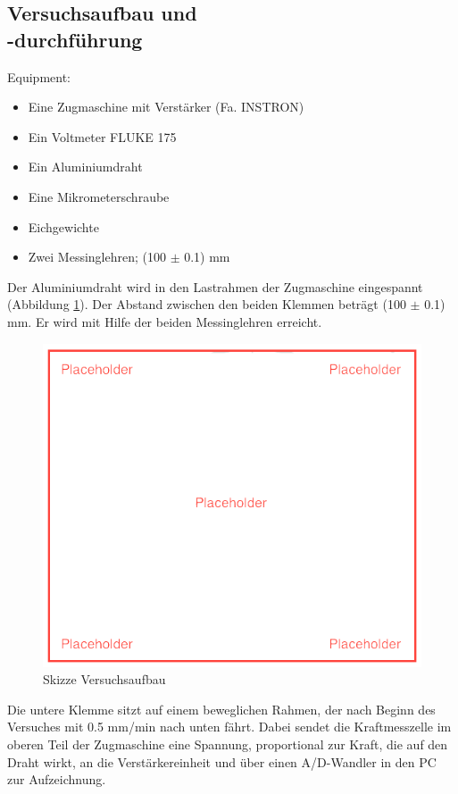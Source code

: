 \documentclass[12pt,a4paper]{article}
\begin{document}
\begin{multicols}{2}
\subsection{Versuchsaufbau und \\-durchführung}
Equipment:\\
\begin{itemize}
	\item Eine Zugmaschine mit Verstärker (Fa. INSTRON)
	\item Ein Voltmeter FLUKE 175
	\item Ein Aluminiumdraht
	\item Eine Mikrometerschraube
	\item Eichgewichte
	\item Zwei Messinglehren; (100 $\pm$ 0.1) mm
\end{itemize}
Der Aluminiumdraht wird in den Lastrahmen der Zugmaschine eingespannt (Abbildung \ref{fig:elastizitaet}). Der Abstand zwischen den beiden Klemmen beträgt (100 $\pm$ 0.1) mm. Er wird mit Hilfe der beiden Messinglehren erreicht.\\
\begin{figure}[H]
	\centering
	\includegraphics[scale=0.4]{./figure/placeholder.png}
	\caption{Skizze Versuchsaufbau}
	\label{fig:elastizitaet}
\end{figure}
Die untere Klemme sitzt auf einem beweglichen Rahmen, der nach Beginn des Versuches mit 0.5 mm/min nach unten fährt. Dabei sendet die Kraftmesszelle im oberen Teil der Zugmaschine eine Spannung, proportional zur Kraft, die auf den Draht wirkt, an die Verstärkereinheit und über einen A/D-Wandler in den PC zur Aufzeichnung.\\

\end{multicols}
\end{document}

